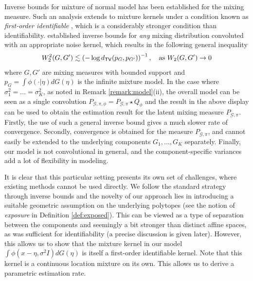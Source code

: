 \documentclass[bj,authoryear]{imsart}
\theoremstyle{plain}
\theoremstyle{remark}
\def\cG{\mathcal{G}}
\def\TV{{\sf TV}}
\begin{document}
Inverse bounds for mixture of normal model has been established \cite{ho2016strong} for the mixing measure. Such an analysis extends to mixture kernels under a condition known as \textit{first-order identifiable} \citep{ho2016strong, guha2021posterior}, which is a considerably stronger condition than identifiability. 
\cite{nguyen2013convergence} established inverse bounds for \textit{any} mixing distribution convoluted with an appropriate noise kernel, which results in the following general inequality
\begin{equation}
    W_2^2(G,G')\lesssim \left(-\log d_{\TV}(p_{G}, p_{G'})\right)^{-1}, \quad \text{as } W_2(G,G')\to 0
\end{equation}
where $G,G'$ are mixing measures with bounded support and $p_G=\int \phi(\cdot|\eta)dG(\eta)$ is the infinite mixture model. In the case where $\sigma_1^2=\dots=\sigma_K^2$, as noted in Remark \ref{remark:model}(ii), the overall model can be seen as a single convolution $P_{\cG,\pi,\phi}=P_{\cG,\pi}\star Q_\phi$ and the result in the above display can be used to obtain the estimation result for the latent mixing measure $P_{\cG,\pi}$. Firstly, the use of such a general inverse bound gives a much slower rate of convergence. Secondly, convergence is obtained for the measure $P_{\cG,\pi}$, and cannot easily be extended to the underlying components $G_1,\dots,G_K$ separately. Finally, our model is not convolutional in general, and the component-specific variances add a lot of flexibility in modeling. 

It is clear that this particular setting presents its own set of challenges, where existing methods cannot be used directly. We follow the standard strategy through inverse bounds and the novelty of our approach lies in introducing a suitable geometric assumption on the underlying polytopes (see the notion of \textit{exposure} in Definition \ref{def:exposed}). This can be viewed as a type of separation between the components and seemingly a bit stronger than distinct affine spaces, as was sufficient for identifiability (a precise discussion is given later). However, this allows us to show that the mixture kernel in our model $\int \phi(x-\eta, \sigma^2 I) dG(\eta)$ is itself a first-order identifiable kernel. Note that this kernel is a continuous location mixture on its own. This allows us to derive a parametric estimation rate. 
\end{document}
